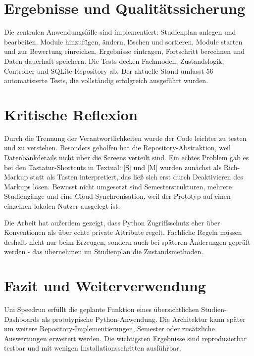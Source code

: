 \documentclass[11pt,a4paper]{article}
\begin{document}
\section{Ergebnisse und Qualitätssicherung}
Die zentralen Anwendungsfälle sind implementiert: Studienplan anlegen und bearbeiten, Module hinzufügen, ändern, löschen und sortieren, Module starten und zur Bewertung einreichen, Ergebnisse eintragen, Fortschritt berechnen und Daten dauerhaft speichern. Die Tests decken Fachmodell, Zustandslogik, Controller und SQLite-Repository ab. Der aktuelle Stand umfasst 56 automatisierte Tests, die vollständig erfolgreich ausgeführt wurden.

\section{Kritische Reflexion}
Durch die Trennung der Verantwortlichkeiten wurde der Code leichter zu testen und zu verstehen. Besonders geholfen hat die Repository-Abstraktion, weil Datenbankdetails nicht über die Screens verteilt sind. Ein echtes Problem gab es bei den Tastatur-Shortcuts in Textual: [S] und [M] wurden zunächst als Rich-Markup statt als Tasten interpretiert, das ließ sich erst durch Deaktivieren des Markups lösen. Bewusst nicht umgesetzt sind Semesterstrukturen, mehrere Studiengänge und eine Cloud-Synchronisation, weil der Prototyp auf einen einzelnen lokalen Nutzer ausgelegt ist.

Die Arbeit hat außerdem gezeigt, dass Python Zugriffsschutz eher über Konventionen als über echte private Attribute regelt. Fachliche Regeln müssen deshalb nicht nur beim Erzeugen, sondern auch bei späteren Änderungen geprüft werden - das übernehmen im Studienplan die Zustandsmethoden.

\section{Fazit und Weiterverwendung}
Uni Speedrun erfüllt die geplante Funktion eines übersichtlichen Studien-Dashboards als prototypische Python-Anwendung. Die Architektur kann später um weitere Repository-Implementierungen, Semester oder zusätzliche Auswertungen erweitert werden. Die wichtigsten Ergebnisse sind reproduzierbar testbar und mit wenigen Installationsschritten ausführbar.
\end{document}
